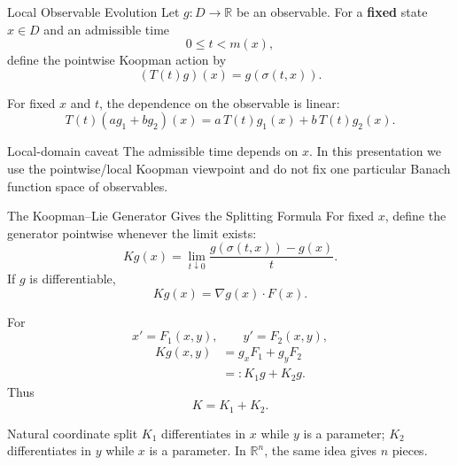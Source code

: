 \documentclass[aspectratio=169,11pt]{beamer}
\newcommand{\R}{\mathbb{R}}
\newcommand{\mstop}{m}
\newcommand{\flow}{\sigma}
\begin{document}
\begin{frame}{Local Observable Evolution}
\small
Let \(g:D\to\R\) be an observable. For a \textbf{fixed} state \(x\in D\) and an admissible time
\[
0\le t<\mstop(x),
\]
define the pointwise Koopman action by
\[
\boxed{(T(t)g)(x)=g(\flow(t,x)).}
\]

For fixed \(x\) and \(t\), the dependence on the observable is linear:
\[
T(t)(a g_1+b g_2)(x)
=
a\,T(t)g_1(x)+b\,T(t)g_2(x).
\]

\begin{center}
\end{center}

\begin{alertblock}{Local-domain caveat}
The admissible time depends on \(x\). In this presentation we use the pointwise/local Koopman viewpoint and do not fix one particular Banach function space of observables.
\end{alertblock}
\end{frame}

\begin{frame}{The Koopman--Lie Generator Gives the Splitting Formula}
\footnotesize
For fixed \(x\), define the generator pointwise whenever the limit exists:
\[
Kg(x)
=
\lim_{t\downarrow0}
\frac{g(\flow(t,x))-g(x)}{t}.
\]
If \(g\) is differentiable,
\[
\boxed{Kg(x)=\nabla g(x)\cdot F(x).}
\]

For
\[
x'=F_1(x,y),\qquad y'=F_2(x,y),
\]
\[
\begin{aligned}
Kg(x,y)
&=g_xF_1+g_yF_2\\
&=:K_1g+K_2g.
\end{aligned}
\]
Thus
\[
\boxed{K=K_1+K_2.}
\]

\begin{alertblock}{Natural coordinate split}
\(K_1\) differentiates in \(x\) while \(y\) is a parameter; \(K_2\) differentiates in \(y\) while \(x\) is a parameter. In \(\R^n\), the same idea gives \(n\) pieces.
\end{alertblock}
\end{frame}
\end{document}
